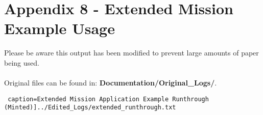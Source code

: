 \documentclass[12pt]{article}
\begin{document}
\section*{Appendix 8 - Extended Mission Example Usage}

Please be aware this output has been modified to prevent large amounts of paper being used.\\\\
Original files can be found in: \textbf{Documentation/Original\_Logs/}.

\texttt{ caption=Extended Mission Application Example Runthrough (Minted)]{../Edited_Logs/extended_runthrough.txt}}
\end{document}
